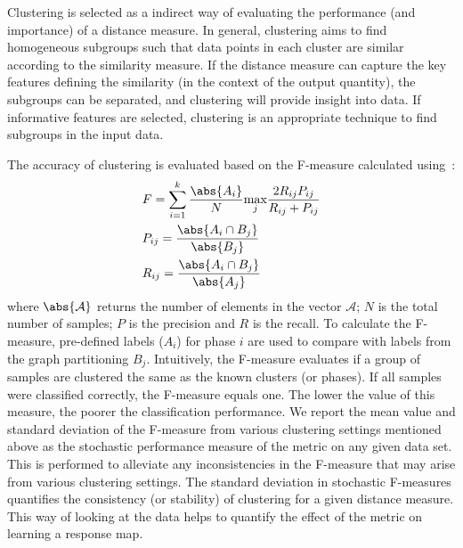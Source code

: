 Clustering is selected as a indirect way of evaluating the performance (and importance) of a distance measure. In general, clustering aims to find homogeneous subgroups such that data points in each cluster are similar according to the similarity measure.
If the distance measure can capture the key features defining the similarity (in the context of the output quantity), the subgroups can be separated, and clustering will provide insight into data.
If informative features are selected, clustering is an appropriate technique to find subgroups in the input data.

The accuracy of clustering is evaluated based on the F-measure calculated using~:
\begin{equation}\label{eq41}
    \begin{aligned}
    & F = \sum_{i=1}^{k} \frac{\abs{A_i}}{N} \underset{j}{\text{max}}  \frac{2R_{ij}P_{ij}}{R_{ij}+P_{ij}}\\
    & P_{ij}=\frac{\abs{A_i\cap B_j}}{\abs{B_j}}\\
    & R_{ij}=\frac{\abs{A_i\cap B_j}}{\abs{A_j}}
    \end{aligned}
\end{equation}
where $\abs{\mathcal{A}}$ returns the number of elements in the vector $\mathcal{A}$; $N$ is the total number of samples; $P$ is the precision and $R$ is the recall.
To calculate the F-measure, pre-defined labels ($A_i$) for phase $i$ are used to compare with labels from the graph partitioning $B_j$.  
Intuitively, the F-measure evaluates if a group of samples are clustered the same as the known clusters (or phases). 
If all samples were classified correctly, the F-measure equals one. 
The lower the value of this measure, the poorer the classification performance. We report the mean value and standard deviation of the F-measure from various clustering settings mentioned above as the stochastic performance measure of the metric on any given data set. This is performed to alleviate any inconsistencies in the F-measure that may arise from various clustering settings. The standard deviation in stochastic F-measures quantifies the consistency (or stability) of clustering for a given distance measure.  This way of looking at the data helps to quantify the effect of the metric on learning a response map.



